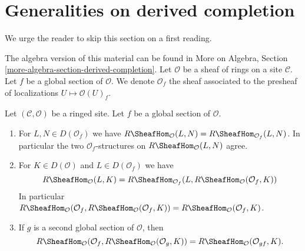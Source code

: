 \section{Generalities on derived completion}
\label{section-derived-completion}

\noindent
We urge the reader to skip this section on a first reading.

\medskip\noindent
The algebra version of this material can be found in
More on Algebra, Section \ref{more-algebra-section-derived-completion}.
Let $\mathcal{O}$ be a sheaf of rings on a site $\mathcal{C}$.
Let $f$ be a global section of $\mathcal{O}$. We denote
$\mathcal{O}_f$ the sheaf associated to the presheaf of localizations
$U \mapsto \mathcal{O}(U)_f$.

\begin{lemma}
\label{lemma-map-twice-localize}
Let $(\mathcal{C}, \mathcal{O})$ be a ringed site. Let $f$ be a global
section of $\mathcal{O}$.
\begin{enumerate}
\item For $L, N \in D(\mathcal{O}_f)$ we have
$R\SheafHom_\mathcal{O}(L, N) = R\SheafHom_{\mathcal{O}_f}(L, N)$.
In particular the two $\mathcal{O}_f$-structures on
$R\SheafHom_\mathcal{O}(L, N)$ agree.
\item For $K \in D(\mathcal{O})$ and
$L \in D(\mathcal{O}_f)$ we have
$$
R\SheafHom_\mathcal{O}(L, K) =
R\SheafHom_{\mathcal{O}_f}(L, R\SheafHom_\mathcal{O}(\mathcal{O}_f, K))
$$
In particular
$R\SheafHom_\mathcal{O}(\mathcal{O}_f,
R\SheafHom_\mathcal{O}(\mathcal{O}_f, K)) =
R\SheafHom_\mathcal{O}(\mathcal{O}_f, K)$.
\item If $g$ is a second global
section of $\mathcal{O}$, then
$$
R\SheafHom_\mathcal{O}(\mathcal{O}_f, R\SheafHom_\mathcal{O}(\mathcal{O}_g, K))
= R\SheafHom_\mathcal{O}(\mathcal{O}_{gf}, K).
$$
\end{enumerate}
\end{lemma}

